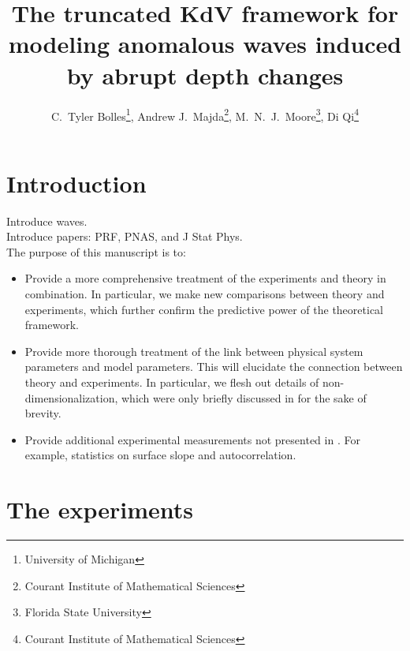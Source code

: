 \documentclass[11pt]{article}
\begin{document}
\title{The truncated KdV framework for modeling anomalous waves induced by abrupt depth changes}

\author{
C.~Tyler Bolles\thanks{University of Michigan},
Andrew J.~Majda\thanks{Courant Institute of Mathematical Sciences}, 
M.~N.~J.~Moore\thanks{Florida State University}, 
Di Qi\thanks{Courant Institute of Mathematical Sciences} }
\maketitle

\section{Introduction}


Introduce waves. \\
Introduce papers: PRF, PNAS, and J Stat Phys. \\

The purpose of this manuscript is to:
\begin{itemize}
\item Provide a more comprehensive treatment of the experiments and theory in combination. In particular, we make new comparisons between theory and experiments, which further confirm the predictive power of the theoretical framework.
\item Provide more thorough treatment of the link between physical system parameters and model parameters. This will elucidate the connection between theory and experiments. In particular, we flesh out details of non-dimensionalization, which were only briefly discussed in \cite{majda2019statistical} for the sake of brevity.
\item Provide additional experimental measurements not presented in \cite{bolles2019anomalous}. For example, statistics on surface slope and autocorrelation.
\end{itemize}

\section{The experiments}
\end{document}
